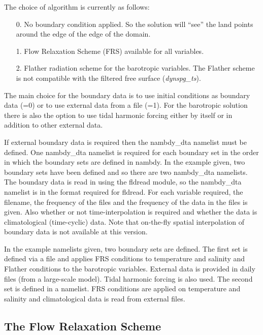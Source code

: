 The choice of algorithm is currently as follows:

\mbox{}

\begin{itemize}
\item[0.] No boundary condition applied. So the solution will ``see''
  the land points around the edge of the edge of the domain.
\item[1.] Flow Relaxation Scheme (FRS) available for all variables. 
\item[2.] Flather radiation scheme for the barotropic variables. The
  Flather scheme is not compatible with the filtered free surface
  ({\it dynspg\_ts}). 
\end{itemize}

\mbox{}

The main choice for the boundary data is
to use initial conditions as boundary data (=0) or to
use external data from a file (=1). For the
barotropic solution there is also the option to use tidal
harmonic forcing either by itself or in addition to other external
data. 

If external boundary data is required then the nambdy\_dta namelist
must be defined. One nambdy\_dta namelist is required for each boundary
set in the order in which the boundary sets are defined in nambdy. In
the example given, two boundary sets have been defined and so there
are two nambdy\_dta namelists. The boundary data is read in using the
fldread module, so the nambdy\_dta namelist is in the format required
for fldread. For each variable required, the filename, the frequency
of the files and the frequency of the data in the files is given. Also
whether or not time-interpolation is required and whether the data is
climatological (time-cyclic) data. Note that on-the-fly spatial
interpolation of boundary data is not available at this version. 

In the example namelists given, two boundary sets are defined. The
first set is defined via a file and applies FRS conditions to
temperature and salinity and Flather conditions to the barotropic
variables. External data is provided in daily files (from a
large-scale model). Tidal harmonic forcing is also used. The second
set is defined in a namelist. FRS conditions are applied on
temperature and salinity and climatological data is read from external
files. 

\subsection{The Flow Relaxation Scheme}
\label{BDY_FRS_scheme}

